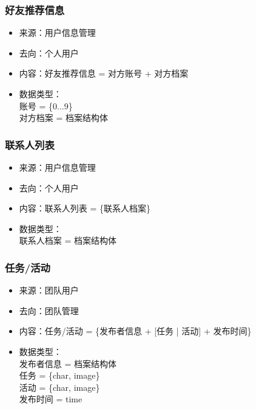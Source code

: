             \subsubsection{好友推荐信息}
            \begin{itemize}
                \item 来源：用户信息管理
                \item 去向：个人用户
                \item 内容：好友推荐信息 = 对方账号 + 对方档案
                \item 数据类型：\\
                账号 = \{0...9\}\\
                对方档案 = 档案结构体\\
            \end{itemize}
            \subsubsection{联系人列表}
            \begin{itemize}
                \item 来源：用户信息管理
                \item 去向：个人用户
                \item 内容：联系人列表 = \{联系人档案\}
                \item 数据类型：\\
                联系人档案 = 档案结构体\\
            \end{itemize}
            \subsubsection{任务/活动}
            \begin{itemize}
                \item 来源：团队用户
                \item 去向：团队管理
                \item 内容：任务/活动 = \{发布者信息 + [任务 | 活动] + 发布时间\}
                \item 数据类型：\\
                发布者信息 = 档案结构体\\
                任务 = \{char, image\}\\
                活动 = \{char, image\}\\
                发布时间 = time\\
            \end{itemize}

